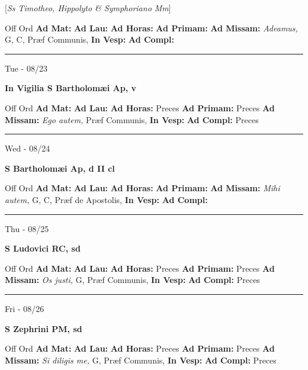 \documentclass[letterpaper, 10pt]{article}
\begin{document}
[\textit{Ss Timotheo, Hippolyto \& Symphoriano Mm}]
\begin{justify}
Off Ord
\textbf{Ad Mat: }
\textbf{Ad Lau: }
\textbf{Ad Horas: }
\textbf{Ad Primam: }
\textbf{Ad Missam:} \textit{Adeamus, } G, C, Præf Communis, 
\textbf{In Vesp: }
\textbf{Ad Compl: }\end{justify}



\hrule
\begin{center}
Tue - 08/23
\end{center}\textbf{ \large In Vigilia S Bartholomæi Ap, \textnormal{\normalsize v}}
\begin{justify}
Off Ord
\textbf{Ad Mat: }
\textbf{Ad Lau: }
\textbf{Ad Horas: }Preces
\textbf{Ad Primam: }Preces
\textbf{Ad Missam:} \textit{Ego autem, } Præf Communis, 
\textbf{In Vesp: }
\textbf{Ad Compl: }Preces\end{justify}



\hrule
\begin{center}
Wed - 08/24
\end{center}\textbf{ \large S Bartholomæi Ap, \textnormal{\normalsize d II cl}}
\begin{justify}
Off Ord
\textbf{Ad Mat: }
\textbf{Ad Lau: }
\textbf{Ad Horas: }
\textbf{Ad Primam: }
\textbf{Ad Missam:} \textit{Mihi autem, } G, C, Præf de Apostolis, 
\textbf{In Vesp: }
\textbf{Ad Compl: }\end{justify}



\hrule
\begin{center}
Thu - 08/25
\end{center}\textbf{ \large S Ludovici RC, \textnormal{\normalsize sd}}
\begin{justify}
Off Ord
\textbf{Ad Mat: }
\textbf{Ad Lau: }
\textbf{Ad Horas: }Preces
\textbf{Ad Primam: }Preces
\textbf{Ad Missam:} \textit{Os justi, } G, Præf Communis, 
\textbf{In Vesp: }
\textbf{Ad Compl: }Preces\end{justify}



\hrule
\begin{center}
Fri - 08/26
\end{center}\textbf{ \large S Zephrini PM, \textnormal{\normalsize sd}}
\begin{justify}
Off Ord
\textbf{Ad Mat: }
\textbf{Ad Lau: }
\textbf{Ad Horas: }Preces
\textbf{Ad Primam: }Preces
\textbf{Ad Missam:} \textit{Si diligis me, } G, Præf Communis, 
\textbf{In Vesp: }
\textbf{Ad Compl: }Preces\end{justify}
\end{document}
